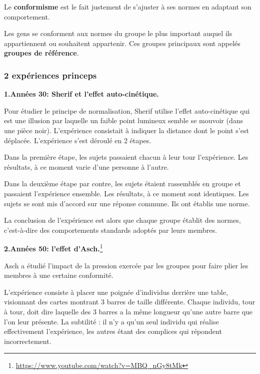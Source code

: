 \documentclass[12pt]{article}
\begin{document}
		 Le \textbf{conformisme} est le fait justement de s'ajuster à ses normes en adaptant son comportement. \newline
		 
		 Les gens se conforment aux normes du groupe le plus important auquel ils appartiennent ou souhaitent appartenir. Ces groupes principaux sont appelés \textbf{groupes de référence}.
		 
		 \subsubsection*{2 expériences princeps}
		 
		 \textbf{1.Années 30: Sherif et l'effet auto-cinétique.} \newline
		 
		 Pour étudier le principe de normalisation, Sherif utilise l'effet auto-cinétique qui est une illusion par laquelle un faible point lumineux semble se mouvoir (dans une pièce noir).  L'expérience consistait à indiquer la distance dont le point s'est déplacée. L'expérience s'est déroulé en 2 étapes. \newline
		 
		 Dans la première étape, les sujets passaient chacun à leur tour l'expérience. Les résultats, à ce moment varie d'une personne à l'autre. \newline
		 
		 Dans la deuxième étape par contre, les sujets étaient rassemblés en groupe et passaient l'expérience ensemble.  Les résultats, à ce moment sont identiques. Les sujets se sont mis d'accord sur une réponse commune. Ils ont établis une norme. \newline
		 
		 La conclusion de l'expérience est alors que chaque groupe établit des normes, c'est-à-dire des comportements standards adoptés par leurs membres. \newline
		 
		 \textbf{2.Années 50: l'effet d'Asch.}\footnote{\url{https://www.youtube.com/watch?v=MBQ_nGy8tMk}} \newline
		 
		 Asch a étudié l'impact de la pression exercée par les groupes pour faire plier les membres à une certaine conformité. \newline
		 
		 L'expérience consiste à placer une poignée d'individus derrière une table, visionnant des cartes montrant 3 barres de taille différente. Chaque individu, tour à tour, doit dire laquelle des 3 barres a la même longueur qu'une autre barre que l'on leur présente. La subtilité : il n'y a qu'un seul individu qui réalise effectivement l'expérience, les autres étant des complices qui répondent incorrectement. \newline
		 
\end{document}
